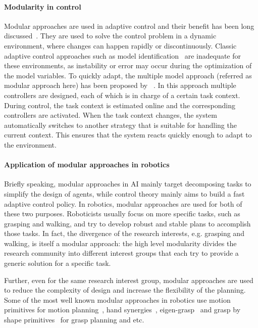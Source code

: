 \paragraph{Modularity in control}
Modular approaches are used in adaptive control and their benefit has been long discussed~\citep{jacobs1991adaptive,narendra1997adaptive}. They are used to solve the control problem in a dynamic environment, where changes can happen rapidly or discontinuously.
Classic adaptive control approaches such as model identification~\citep{khalil2004modeling} are inadequate for these environments, as instability or error may occur during the optimization of the model variables. To quickly adapt, the multiple model approach (referred as modular approach here) has been proposed by ~\citet{narendra1995adaptation}.
In this approach multiple controllers are designed, each of which is in charge of a certain task context. During control, the task context is estimated online and the corresponding controllers are activated. When the task context changes, the system automatically switches to another strategy that is suitable for handling the current context. This ensures that the system reacts quickly enough to adapt to the environment.

\paragraph{Application of modular approaches in robotics}
Briefly speaking, modular approaches in AI mainly target decomposing tasks to simplify the design of agents, while control theory mainly aims to build a fast adaptive control policy. In robotics, modular approaches are used for both of these two purposes. Roboticists usually focus on more specific tasks, such as grasping and walking, and try to develop robust and stable plans to accomplish those tasks. In fact, the divergence of the research interests, e.g. grasping and walking, is itself a modular approach: the high level modularity divides the research community into different interest groups that each try to provide a generic solution for a specific task.

Further, even for the same research interest group, modular approaches are used to reduce the complexity of design and increase the flexibility of the planning. Some of the most well known modular approaches in robotics use motion primitives for motion planning~\citep{ijspeert2002movement,inamura2004embodied,kulic2008incremental,peters2008reinforcement}, hand synergies~\citep{santello2000force,gabiccini2011role,gioioso2013mapping}, eigen-grasp~\citep{Ciocarlie2009} and grasp by shape primitives~\citep{miller2003automatic,huebner2008minimum} for grasp planning and etc.




